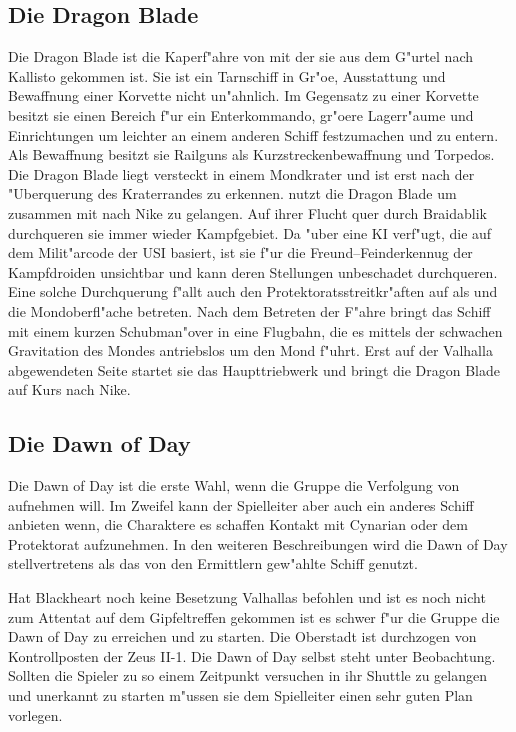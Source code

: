 \subsection{Die Dragon Blade}

Die Dragon Blade ist die Kaperf"ahre von \xl{} mit der sie aus dem G"urtel nach Kallisto gekommen ist. Sie ist ein Tarnschiff in Gr"o\3e, Ausstattung und Bewaffnung einer Korvette nicht un"ahnlich. Im Gegensatz zu einer Korvette besitzt sie einen Bereich f"ur ein Enterkommando, gr"o\3ere Lagerr"aume und Einrichtungen um leichter an einem anderen Schiff festzumachen und zu entern. Als Bewaffnung besitzt sie Railguns als Kurzstreckenbewaffnung und Torpedos. Die Dragon Blade liegt versteckt in einem Mondkrater und ist erst nach der "Uberquerung des Kraterrandes zu erkennen. \xl{} nutzt die Dragon Blade um zusammen mit \ml{} nach Nike zu gelangen. Auf ihrer Flucht quer durch Braidablik durchqueren sie immer wieder Kampfgebiet. Da \xl{} "uber eine KI verf"ugt, die auf dem Milit"arcode der USI basiert, ist sie f"ur die Freund--Feinderkennug der Kampfdroiden unsichtbar und kann deren Stellungen unbeschadet durchqueren. Eine solche Durchquerung f"allt auch den Protektoratsstreitkr"aften auf als \xl{} und \ml{} die Mondoberfl"ache betreten. Nach dem Betreten der F"ahre bringt \xl{} das Schiff mit einem kurzen Schubman"over in eine Flugbahn, die es mittels der schwachen Gravitation des Mondes antriebslos um den Mond f"uhrt. Erst auf der Valhalla abgewendeten Seite startet sie das Haupttriebwerk und bringt die Dragon Blade auf Kurs nach Nike. 

\subsection{Die Dawn of Day}
Die Dawn of Day ist die erste Wahl, wenn die Gruppe die Verfolgung von \xl{} aufnehmen will. Im Zweifel kann der Spielleiter aber auch ein anderes Schiff anbieten wenn, die Charaktere es schaffen Kontakt mit Cynarian oder dem Protektorat aufzunehmen. In den weiteren Beschreibungen wird die Dawn of Day stellvertretens als das von den Ermittlern gew"ahlte Schiff genutzt.

Hat Blackheart noch keine Besetzung Valhallas befohlen und ist es noch nicht zum Attentat auf dem Gipfeltreffen gekommen ist es schwer f"ur die Gruppe die Dawn of Day zu erreichen und zu starten. Die Oberstadt ist durchzogen von Kontrollposten der Zeus II-1. Die Dawn of Day selbst steht unter Beobachtung. Sollten die Spieler zu so einem Zeitpunkt versuchen in ihr Shuttle zu gelangen und unerkannt zu starten m"ussen sie dem Spielleiter einen sehr guten Plan vorlegen.

